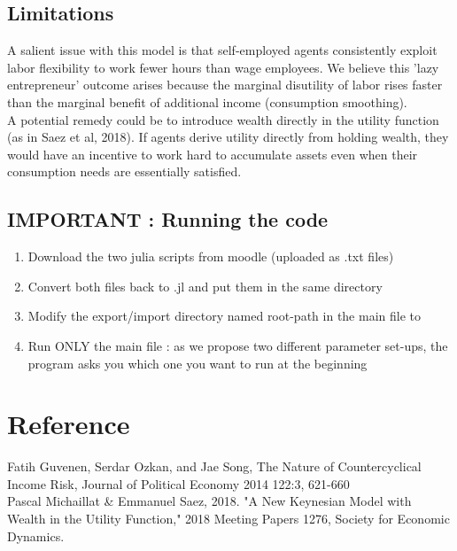 \documentclass{article}
\begin{document}
\subsection{Limitations}
A salient issue with this model is that self-employed agents consistently exploit labor flexibility to work fewer hours than wage employees. We believe this 'lazy entrepreneur' outcome arises because the marginal disutility of labor rises faster than the marginal benefit of additional income (consumption smoothing).\\
A potential remedy could be to introduce wealth directly in the utility function (as in Saez et al, 2018). If agents derive utility directly from holding wealth, they would have an incentive to work hard to accumulate assets even when their consumption needs are essentially satisfied.

\subsection{IMPORTANT : Running the code}
\begin{enumerate}
    \item Download the two julia scripts from moodle (uploaded as .txt files)
    \item Convert both files back to .jl  and put them in the same directory
    \item Modify the export/import directory named root-path in the main file to
    \item Run ONLY the main file : as we propose two different parameter set-ups, the program asks you which one you want to run at the beginning 
\end{enumerate}

\section{Reference}
Fatih Guvenen, Serdar Ozkan, and Jae Song, The Nature of Countercyclical Income Risk, Journal of Political Economy 2014 122:3, 621-660\\
Pascal Michaillat \& Emmanuel Saez, 2018. "A New Keynesian Model with Wealth in the Utility Function," 2018 Meeting Papers 1276, Society for Economic Dynamics.
\end{document}
